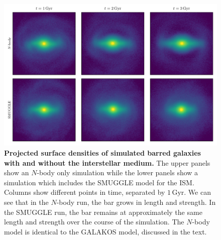 \documentclass{natureprintstyle}
\newcommand{\Nbody}{$N$-body}
\begin{document}
\begin{figure}[h!]%
\centering
\includegraphics[width=18cm]{fig/fig1.pdf}
\caption{\textbf{Projected surface densities of simulated barred galaxies with
and without the interstellar medium.} The upper panels show an \Nbody{} only
simulation while the lower panels show a simulation which includes the SMUGGLE
model for the ISM. Columns show different points in time, separated by
$1\,\textrm{Gyr}$. We can see that in the \Nbody{} run, the bar grows in
length and strength. In the SMUGGLE run, the bar remains at approximately the
same length and strength over the course of the simulation. The \Nbody{} model
is identical to the GALAKOS model, discussed in the text.}\label{fig:overview}
\end{figure}
\end{document}
